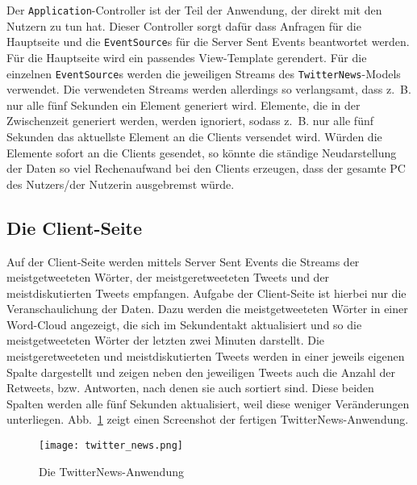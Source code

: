 Der \lstinline|Application|-Controller ist der Teil der Anwendung, der direkt mit den Nutzern zu tun hat.
Dieser Controller sorgt dafür dass Anfragen für die Hauptseite und die \lstinline|EventSource|s für die Server Sent Events beantwortet werden.
Für die Hauptseite wird ein passendes View-Template gerendert.
Für die einzelnen \lstinline|EventSource|s werden die jeweiligen Streams des \lstinline|TwitterNews|-Models verwendet.
Die verwendeten Streams werden allerdings so verlangsamt, dass z.~B. nur alle fünf Sekunden ein Element generiert wird.
Elemente, die in der Zwischenzeit generiert werden, werden ignoriert, sodass z.~B. nur alle fünf Sekunden das aktuellste Element an die Clients versendet wird.
Würden die Elemente sofort an die Clients gesendet, so könnte die ständige Neudarstellung der Daten so viel Rechenaufwand bei den Clients erzeugen, dass der gesamte PC des Nutzers/der Nutzerin ausgebremst würde.


\subsection{Die Client-Seite} %
\label{sub:die_client_seite}

Auf der Client-Seite werden mittels Server Sent Events die Streams der meistgetweeteten Wörter, der meistgeretweeteten Tweets und der meistdiskutierten Tweets empfangen.
Aufgabe der Client-Seite ist hierbei nur die Veranschaulichung der Daten.
Dazu werden die meistgetweeteten Wörter in einer Word-Cloud angezeigt, die sich im Sekundentakt aktualisiert und so die meistgetweeteten Wörter der letzten zwei Minuten darstellt.
Die meistgeretweeteten und meistdiskutierten Tweets werden in einer jeweils eigenen Spalte dargestellt und zeigen neben den jeweiligen Tweets auch die Anzahl der Retweets, bzw. Antworten, nach denen sie auch sortiert sind.
Diese beiden Spalten werden alle fünf Sekunden aktualisiert, weil diese weniger Veränderungen unterliegen.
Abb.~\ref{fig:die_twitternews_anwendung} zeigt einen Screenshot der fertigen TwitterNews-Anwendung.

\begin{figure}[h]
\centering
\texttt{[image: twitter\_news.png]}
\caption{Die TwitterNews-Anwendung}
\label{fig:die_twitternews_anwendung}
\end{figure}



